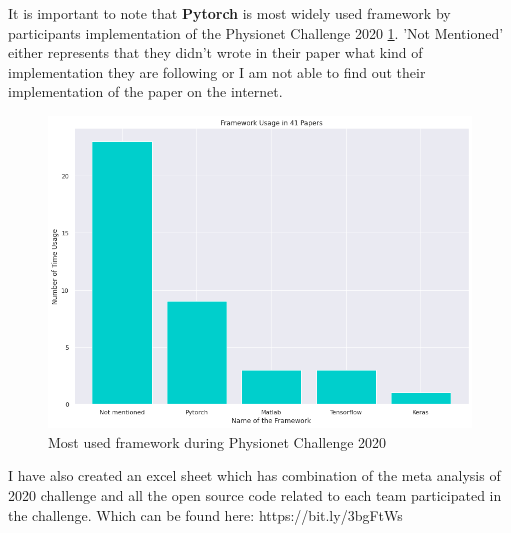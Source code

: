 It is important to note that \textbf{Pytorch} is most widely used framework by participants implementation of the Physionet Challenge 2020 \ref{fig:framework_used_by_2020_teams}. 'Not Mentioned' either represents that they didn't wrote in their paper what kind of implementation they are following or I am not able to find out their implementation of the paper on the internet. 

\begin{figure}[H]
\centering
\includegraphics[scale=0.5]{img/framework_usage_in_papers.png}
\caption{Most used framework during Physionet Challenge 2020}
\label{fig:framework_used_by_2020_teams}
\end{figure}

I have also created an excel sheet which has combination of the meta analysis of 2020 challenge \cite{main_arythmia_detection} and all the open source code related to each team participated in the challenge. Which can be found here: https://bit.ly/3bgFtWs 

